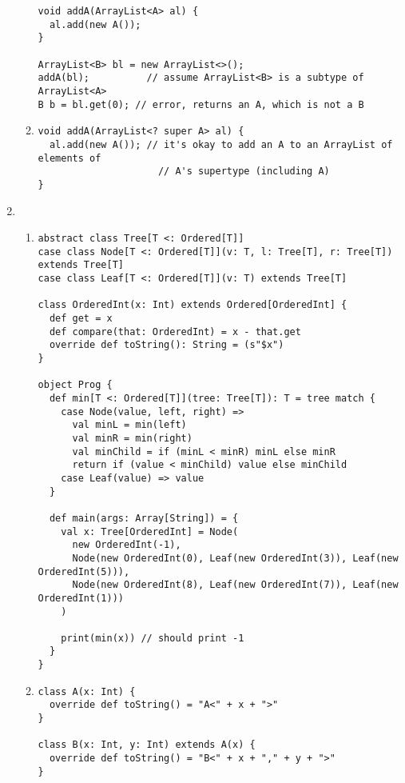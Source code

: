 \documentclass[a4paper,11pt]{article} %
\begin{document}
\begin{enumerate}
\begin{enumerate}
\begin{lstlisting}
void addA(ArrayList<A> al) {
  al.add(new A());
}

ArrayList<B> bl = new ArrayList<>();
addA(bl);          // assume ArrayList<B> is a subtype of ArrayList<A>
B b = bl.get(0); // error, returns an A, which is not a B
\end{lstlisting}

    \item %

\begin{lstlisting}
void addA(ArrayList<? super A> al) {
  al.add(new A()); // it's okay to add an A to an ArrayList of elements of
                     // A's supertype (including A)
}
\end{lstlisting}

  \end{enumerate}

  \item %
  \begin{enumerate}
    \item %
\begin{lstlisting}
abstract class Tree[T <: Ordered[T]]
case class Node[T <: Ordered[T]](v: T, l: Tree[T], r: Tree[T]) extends Tree[T]
case class Leaf[T <: Ordered[T]](v: T) extends Tree[T]

class OrderedInt(x: Int) extends Ordered[OrderedInt] {
  def get = x
  def compare(that: OrderedInt) = x - that.get
  override def toString(): String = (s"$x")
}

object Prog {
  def min[T <: Ordered[T]](tree: Tree[T]): T = tree match {
    case Node(value, left, right) =>
      val minL = min(left)
      val minR = min(right)
      val minChild = if (minL < minR) minL else minR
      return if (value < minChild) value else minChild
    case Leaf(value) => value
  }

  def main(args: Array[String]) = {
    val x: Tree[OrderedInt] = Node(
      new OrderedInt(-1),
      Node(new OrderedInt(0), Leaf(new OrderedInt(3)), Leaf(new OrderedInt(5))),
      Node(new OrderedInt(8), Leaf(new OrderedInt(7)), Leaf(new OrderedInt(1)))
    )

    print(min(x)) // should print -1
  }
}
\end{lstlisting}

    \item %
\begin{lstlisting}
class A(x: Int) {
  override def toString() = "A<" + x + ">"
}

class B(x: Int, y: Int) extends A(x) {
  override def toString() = "B<" + x + "," + y + ">"
}


\end{lstlisting}
\end{enumerate}
\end{enumerate}
\end{document}
